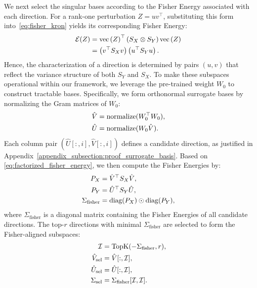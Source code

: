 \documentclass{article}
\theoremstyle{plain}
\theoremstyle{definition}
\theoremstyle{remark}
\begin{document}
We next select the singular bases according to the Fisher Energy associated with each direction. For a rank-one perturbation $Z = u v^\top$, substituting this form into~\eqref{eq:fisher_kron} yields its corresponding Fisher Energy:
\begin{align}
\mathcal{E}(Z) &= \mathrm{vec}\left(Z\right)^\top \left(S_X \otimes S_Y\right) \mathrm{vec}\left(Z\right) \notag\\
&= \left(v^\top S_X v\right) \left(u^\top S_Y u\right). \label{eq:factorized_fisher_energy}
\end{align}
Hence, the characterization of a direction is determined by pairs $(u,v)$ that reflect the variance structure of both $S_Y$ and $S_X$. To make these subspaces operational within our framework, we leverage the pre-trained weight $W_0$ to construct tractable bases. Specifically, we form orthonormal surrogate bases by normalizing the Gram matrices of $W_0$:
\begin{align}
\hat{V} &= \mathrm{normalize}(W_0^\top W_0), \notag \\
\hat{U} &= \mathrm{normalize}(W_0 \hat{V}). 
\end{align}
Each column pair $(\hat{U}[:, i], \hat{V}[:, i])$ defines a candidate direction, as justified in Appendix~\ref{appendix_subsection:proof_surrogate_basis}. Based on \eqref{eq:factorized_fisher_energy}, we then compute the Fisher Energies by:
\begin{align}
P_X = & \; \hat{V}^\top S_X \hat{V}, \notag\\
P_Y = & \; \hat{U}^\top S_Y \hat{U}, \notag\\
\Sigma_{\text{fisher}} = & \; \mathrm{diag}(P_X) \odot \mathrm{diag}(P_Y), 
\end{align}
where $\Sigma_{\text{fisher}}$ is a diagonal matrix containing the Fisher Energies of all candidate directions.
The top-$r$ directions with minimal $\Sigma_{\text{fisher}}$ are selected to form the Fisher-aligned subspaces:
\begin{align}
\mathcal{I} &= \mathrm{TopK}(-\Sigma_{\text{fisher}}, r), \notag\\
\hat{V}_{\text{sel}} &= \hat{V}[:, \mathcal{I}], \notag\\
\hat{U}_{\text{sel}} &= \hat{U}[:, \mathcal{I}], \notag\\
\Sigma_{\text{sel}} &= \Sigma_{\text{fisher}}[\mathcal{I}, \mathcal{I}]. 
\end{align}
\end{document}
